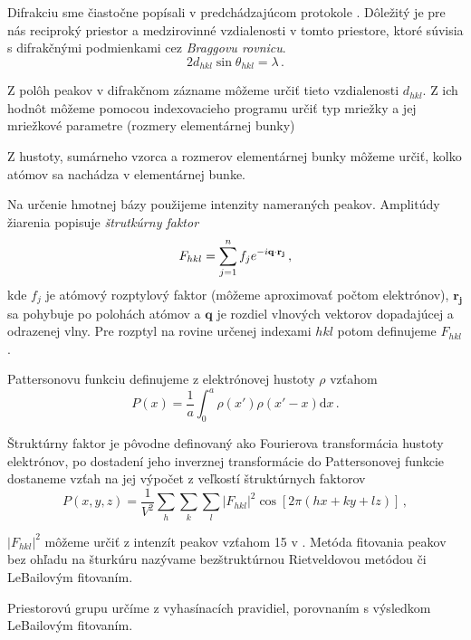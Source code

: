 \documentclass[a4paper, 10pt]{article}
\newcommand{\dd}{\ensuremath{ \mathrm{d} }}
\begin{document}
Difrakciu sme čiastočne popísali v predchádzajúcom protokole \cite{predch}. Dôležitý je pre nás reciproký priestor a medzirovinné vzdialenosti v tomto priestore, ktoré súvisia s difrakčnými podmienkami cez \textit{Braggovu rovnicu}. 
\begin{equation}
\label{eq:teor:bragg}
2 d_{hkl} \sin\theta_{hkl} = \lambda\,.
\end{equation}

Z polôh peakov v difrakčnom zázname môžeme určiť tieto vzdialenosti $d_{hkl}$. Z ich hodnôt môžeme pomocou indexovacieho programu určiť typ mriežky a jej mriežkové parametre (rozmery elementárnej bunky)

Z hustoty, sumárneho vzorca a rozmerov elementárnej bunky môžeme určiť, kolko atómov sa nachádza v elementárnej bunke. 

Na určenie hmotnej bázy použijeme intenzity nameraných peakov. Amplitúdy žiarenia popisuje \textit{štrutkúrny faktor}
\begin{equation}
\label{eq:teor:strukturny_faktor}
F_{hkl} = \sum_{j=1}^n f_j e^{-i\bold{q}\cdot \mathbf{r_j}}\,,
\end{equation}
kde $f_j$ je atómový rozptylový faktor (môžeme aproximovať počtom elektrónov), $\mathbf{r_j}$ sa pohybuje po polohách atómov a $\mathbf{q}$ je rozdiel vlnových vektorov dopadajúcej a odrazenej vlny. Pre rozptyl na rovine určenej indexami $hkl$ potom definujeme $F_{hkl}$.

Pattersonovu funkciu definujeme z elektrónovej hustoty $\rho$ vzťahom 
\begin{equation}
\label{eq:teor:patterson}
P(x) = \frac 1a \int_0^a \rho(x')\rho(x'-x)\dd x\,.
\end{equation}

Štruktúrny faktor je pôvodne definovaný ako Fourierova transformácia hustoty elektrónov, po dostadení jeho inverznej transformácie do Pattersonovej funkcie dostaneme vzťah na jej výpočet z veľkostí štruktúrnych faktorov
\begin{equation}
\label{eq:teor:patterson_z_Fhkl}
P(x, y, z) = \frac{1}{V^2}\sum_h \sum_k \sum_l |F_{hkl}|^2\cos[2\pi (hx + ky + lz)]\,,
\end{equation}

$|F_{hkl}|^2$ môžeme určiť z intenzít peakov vzťahom 15 v \cite{stud}.
Metóda fitovania peakov bez ohľadu na šturkúru nazývame bezštruktúrnou Rietveldovou metódou či LeBailovým fitovaním. 

Priestorovú grupu určíme z vyhasínacích pravidiel, porovnaním s výsledkom LeBailovým fitovaním.
\end{document}
